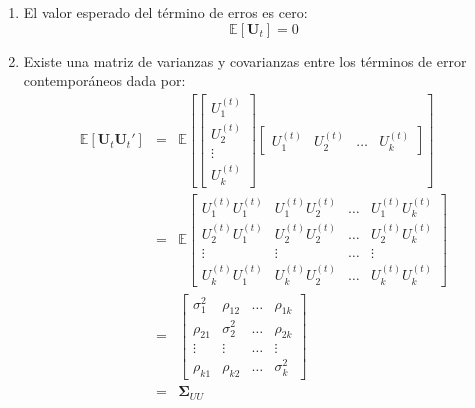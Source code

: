 \documentclass[
  a4paper,
]{article}
\begin{document}
\begin{enumerate}
    \item El valor esperado del término de erros es cero:
    $$
        \mathbb{E}[\mathbf{U}_t] = 0
    $$

    \item Existe una matriz de varianzas y covarianzas entre los términos de error contemporáneos dada por:
    \begin{eqnarray}
        \mathbb{E}[\mathbf{U}_t \mathbf{U}_t'] 
        & = &
        \mathbb{E} \left[
        \begin{bmatrix}
        U^{(t)}_{1} \\ U^{(t)}_{2} \\ \vdots \\ U^{(t)}_{k}
        \end{bmatrix}
        \begin{bmatrix}
        U^{(t)}_{1} & U^{(t)}_{2} & \ldots & U^{(t)}_{k}
        \end{bmatrix}
        \right] \nonumber \\
        & = & \mathbb{E}
        \begin{bmatrix}
        U^{(t)}_{1} U^{(t)}_{1} & U^{(t)}_{1} U^{(t)}_{2} & \ldots & U^{(t)}_{1} U^{(t)}_{k} \\
        U^{(t)}_{2} U^{(t)}_{1} & U^{(t)}_{2} U^{(t)}_{2} & \ldots & U^{(t)}_{2} U^{(t)}_{k} \\
        \vdots & \vdots & \ldots & \vdots \\
        U^{(t)}_{k} U^{(t)}_{1} & U^{(t)}_{k} U^{(t)}_{2} & \ldots & U^{(t)}_{k} U^{(t)}_{k}
        \end{bmatrix} \nonumber \\
        & = & \begin{bmatrix}
        \sigma^2_1 & \rho_{12} & \ldots & \rho_{1k} \\
        \rho_{21} & \sigma^2_2 & \ldots & \rho_{2k} \\
        \vdots & \vdots & \ldots & \vdots \\
        \rho_{k1} & \rho_{k2} & \ldots & \sigma^2_k
        \end{bmatrix} \nonumber \\
        & = & \mathbf{\Sigma}_{UU}
        \label{Sigma_VAR}
    \end{eqnarray} 


\end{enumerate}
\end{document}
